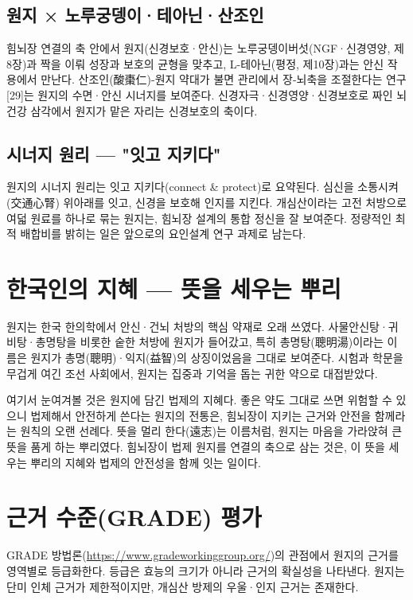 \documentclass[12pt,oneside]{book}
\begin{document}
\subsection{원지 × 노루궁뎅이·테아닌·산조인}

힘뇌장 연결의 축 안에서 원지(신경보호·안신)는 노루궁뎅이버섯(NGF·신경영양, 제8장)과 짝을 이뤄 성장과 보호의 균형을 맞추고, L-테아닌(평정, 제10장)과는 안신 작용에서 만난다. 산조인(酸棗仁)-원지 약대가 불면 관리에서 장-뇌축을 조절한다는 연구[29]는 원지의 수면·안신 시너지를 보여준다. 신경자극·신경영양·신경보호로 짜인 뇌 건강 삼각에서 원지가 맡은 자리는 신경보호의 축이다.

\subsection{시너지 원리 — "잇고 지키다"}

원지의 시너지 원리는 잇고 지키다(connect \& protect)로 요약된다. 심신을 소통시켜(交通心腎) 위아래를 잇고, 신경을 보호해 인지를 지킨다. 개심산이라는 고전 처방으로 여덟 원료를 하나로 묶는 원지는, 힘뇌장 설계의 통합 정신을 잘 보여준다. 정량적인 최적 배합비를 밝히는 일은 앞으로의 요인설계 연구 과제로 남는다.

\section{한국인의 지혜 — 뜻을 세우는 뿌리}

원지는 한국 한의학에서 안신·건뇌 처방의 핵심 약재로 오래 쓰였다. 사물안신탕·귀비탕·총명탕을 비롯한 숱한 처방에 원지가 들어갔고, 특히 총명탕(聰明湯)이라는 이름은 원지가 총명(聰明)·익지(益智)의 상징이었음을 그대로 보여준다. 시험과 학문을 무겁게 여긴 조선 사회에서, 원지는 집중과 기억을 돕는 귀한 약으로 대접받았다.

여기서 눈여겨볼 것은 원지에 담긴 법제의 지혜다. 좋은 약도 그대로 쓰면 위험할 수 있으니 법제해서 안전하게 쓴다는 원지의 전통은, 힘뇌장이 지키는 근거와 안전을 함께라는 원칙의 오랜 선례다. 뜻을 멀리 한다(遠志)는 이름처럼, 원지는 마음을 가라앉혀 큰 뜻을 품게 하는 뿌리였다. 힘뇌장이 법제 원지를 연결의 축으로 삼는 것은, 이 뜻을 세우는 뿌리의 지혜와 법제의 안전성을 함께 잇는 일이다.

\section{근거 수준(GRADE) 평가}

GRADE 방법론(\url{https://www.gradeworkinggroup.org/})의 관점에서 원지의 근거를 영역별로 등급화한다. 등급은 효능의 크기가 아니라 근거의 확실성을 나타낸다. 원지는 단미 인체 근거가 제한적이지만, 개심산 방제의 우울·인지 근거는 존재한다.
\end{document}

